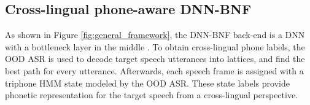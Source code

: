 \documentclass[a4paper]{article}
\begin{document}
\subsection{Cross-lingual phone-aware DNN-BNF}
As shown in Figure \ref{fig:general_framework}, the DNN-BNF back-end
is a DNN with a bottleneck   layer in the middle \cite{grezl2009investigation}. 
To obtain cross-lingual phone labels, the OOD ASR is used to decode {\color{blue}  target speech utterances into  lattices,} and find the best path for every utterance. Afterwards, each speech frame is assigned with a triphone HMM state modeled by the OOD ASR. These   state labels provide phonetic representation for the target speech from a cross-lingual perspective. %

\end{document}
